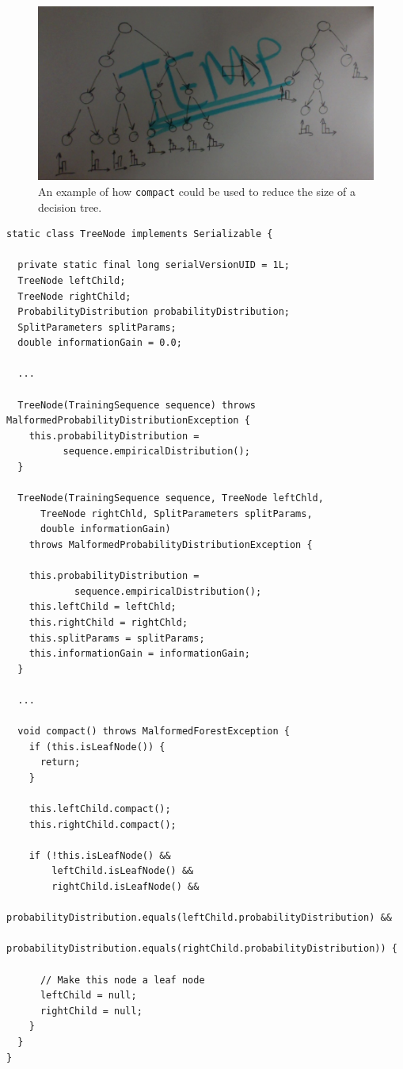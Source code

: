 \documentclass[12pt,twoside,notitlepage]{report}
\begin{document}
                \begin{figure}[H]
                  \centering
                  \includegraphics[scale=0.35]{tree_compaction.jpeg}
                  \caption{An example of how \texttt{compact} could be used to reduce the size of a decision tree.}
                \end{figure}

                \begin{lstlisting}[caption={The \texttt{TreeNode} declaration, found as a static class within the 
                \texttt{DecisionForest} class.},label={lst:TreeNode}]
static class TreeNode implements Serializable {

  private static final long serialVersionUID = 1L;
  TreeNode leftChild;
  TreeNode rightChild;
  ProbabilityDistribution probabilityDistribution;
  SplitParameters splitParams;
  double informationGain = 0.0;

  ...

  TreeNode(TrainingSequence sequence) throws MalformedProbabilityDistributionException {
    this.probabilityDistribution = 
          sequence.empiricalDistribution();
  }

  TreeNode(TrainingSequence sequence, TreeNode leftChld, 
      TreeNode rightChld, SplitParameters splitParams, 
      double informationGain) 
    throws MalformedProbabilityDistributionException {

    this.probabilityDistribution = 
            sequence.empiricalDistribution();
    this.leftChild = leftChld;
    this.rightChild = rightChld;
    this.splitParams = splitParams;  
    this.informationGain = informationGain;
  }

  ...

  void compact() throws MalformedForestException {
    if (this.isLeafNode()) {
      return;
    }
    
    this.leftChild.compact();
    this.rightChild.compact();

    if (!this.isLeafNode() && 
        leftChild.isLeafNode() &&
        rightChild.isLeafNode() &&
        probabilityDistribution.equals(leftChild.probabilityDistribution) &&
        probabilityDistribution.equals(rightChild.probabilityDistribution)) {
      
      // Make this node a leaf node
      leftChild = null;
      rightChild = null;
    }
  }
}
                \end{lstlisting}
\end{document}
